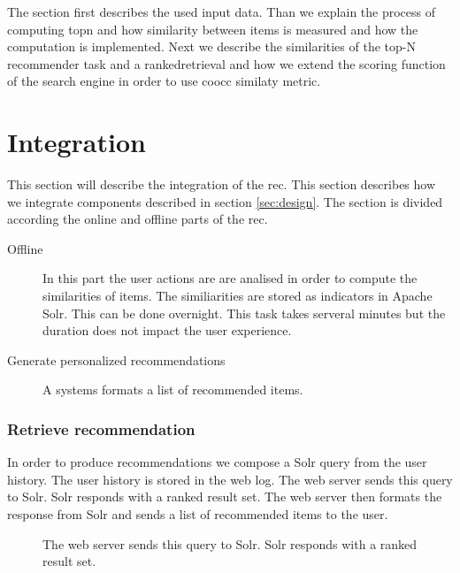 The section first describes the used input data. Than we explain the process of computing \gls{topn} and how similarity between items is measured and how the computation is implemented. Next we describe the similarities of the top-N recommender task and a \gls{rankedretrieval} and how we extend the scoring function of the search engine in order to use \gls{coocc} similaty metric.







\section{Integration}
\label{sec:integration}

This section will describe the integration of the \gls{rec}. This section describes how we integrate components described in section \ref{sec:design}. The section is divided according the online and offline parts of the \gls{rec}.

\begin{description}
\item[Offline] In this part the user actions are are analised in order to compute the similarities of items. The similiarities are stored as indicators in Apache Solr. This can be done overnight. This task takes serveral minutes but the duration does not impact the user experience. 
\item[Generate personalized recommendations] A systems formats a list of recommended items.
\end{description}


\subsubsection{Retrieve recommendation}

In order to produce recommendations we compose a Solr query from the user history. The user history is stored in the web log. The web server sends this query to Solr. Solr responds with a ranked result set. The web server then formats the response from Solr and sends a list of recommended items to the user.

\begin{figure}
\centering
{}
\caption{The web server sends this query to Solr. Solr responds with a ranked result set.}
\end{figure}

